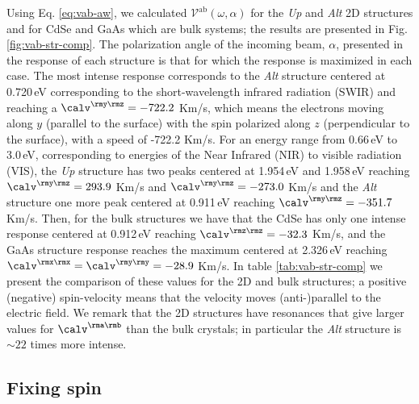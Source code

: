 \documentclass[prb,11pt,tightenlines,twocolumn,aps]{revtex4-1}
\begin{document}
Using  Eq. \eqref{eq:vab-aw}, we calculated
$\mathcal{V}^{\mathrm{ab}}(\omega,\alpha)$ for the \emph{Up} and \emph{Alt} 2D
structures and for CdSe and GaAs which are bulk systems; the results are
presented in Fig. \ref{fig:vab-str-comp}. The polarization angle of the
incoming beam, $\alpha$, presented in the response of each structure is that
for which the response is maximized in each case.
% 
The most intense response corresponds to the \emph{Alt} structure centered at
0.720\,eV corresponding to the short-wavelength infrared radiation (SWIR) and
reaching a $\calv^{\rmy\rmz}=-722.2$ Km/s, which means the electrons moving
along $y$ (parallel to the surface) with the spin polarized along $z$
(perpendicular to the surface), with a speed of -722.2 Km/s.
% 
For an energy range from 0.66\,eV to 3.0\,eV, corresponding to energies of the
Near Infrared (NIR) to visible radiation (VIS), the \emph{Up} structure has two
peaks centered at 1.954\,eV and 1.958\,eV reaching $\calv^{\rmy\rmz}=293.9$
Km/s and $\calv^{\rmy\rmz}=-273.0$ Km/s and the \emph{Alt} structure one more
peak centered at 0.911\,eV reaching $\calv^{\rmy\rmz}=-351.7$ Km/s.
% 
Then, for the bulk structures we have that the CdSe has only one intense
response centered at 0.912\,eV reaching $\calv^{\rmz\rmz}=-32.3$ Km/s, and the
GaAs structure response reaches the maximum centered at 2.326\,eV reaching
$\calv^{\rmx\rmx}=\calv^{\rmy\rmy}=-28.9$ Km/s.
% 
In table \ref{tab:vab-str-comp} we present the comparison of these values for
the 2D and bulk structures; a positive (negative) spin-velocity means that the
velocity moves (anti-)parallel to the electric field.
% 
We remark that the 2D structures have resonances that give larger values for
$\calv^{\rma\rmb}$ than the bulk crystals; in particular the \emph{Alt}
structure is $\sim 22$ times more intense.





\subsection{Fixing spin} %
\label{sec:res-fixspin}


\end{document}
